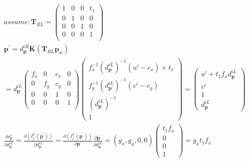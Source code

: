 \documentclass{article}
\begin{document}
\begin{CJK*}{GBK}{song}
\begin{equation}\left.\begin{aligned}
&
assume:
\textbf{T}_{RL}=
\left(
  \begin{array}{cccc}
    1 & 0 & 0 & t_{1} \\
    0 & 1 & 0 & 0     \\
    0 & 0 & 1 & 0     \\
    0 & 0 & 0 & 1     \\
  \end{array}
\right)
\\&
\textbf{p}^{'}=d_\textbf{p}^{iR}\textbf{K}(\textbf{T}_{RL}\textbf{p}_w)
\\&
=d_\textbf{p}^{iL}
\left(
  \begin{array}{cccc}
    f_x & 0 & c_x & 0 \\
    0 & f_y & c_y & 0 \\
    0 & 0 & 1 & 0     \\
    0 & 0 & 0 & 1     \\
  \end{array}
\right)
\begin{pmatrix}
f_x^{-1}(d_\textbf{p}^{iL})^{-1}(u^i-c_x)+t_1
\\f_y^{-1}(d_\textbf{p}^{iL})^{-1}(v^i-c_y)
\\(d_\textbf{p}^{iL})^{-1}
\\1
\end{pmatrix}
=\begin{pmatrix}
u^i+t_1f_xd_\textbf{p}^{iL}
\\v^i
\\1
\\d_\textbf{p}^{iL}
\end{pmatrix}
\\&
\frac{\partial{r^{s}_{\textbf{p}}}}{\partial{d_\textbf{p}^{iL}}} =
\frac{\partial{(I^L_j(\textbf{p}^{'}))}}{\partial{d_\textbf{p}^{iL}}}  =
\frac{\partial{(I^L_j(\textbf{p}^{'}))}}{\partial{\textbf{p}^{'}}}
\frac{\partial{\textbf{p}^{'}}}{\partial{d_\textbf{p}^{iL}}}
=(g_x,g_y,0,0)\begin{pmatrix}
t_1f_x
\\0
\\0
\\1
\end{pmatrix}
=g_xt_1f_x
\\&
\end{aligned}\tag{2.2}\right.\end{equation}


\end{CJK*}
\end{document}
